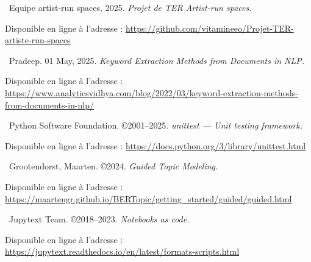 \documentclass[mstat,12pt]{unswthesis}
\begin{document}
\hypertarget{refs}{}
\begin{CSLReferences}{0}{0}

\leavevmode\hypertarget{ref-ARS}{}%
\textbullet\ Equipe artist-run spaces, 2025. \emph{Projet de TER Artist-run spaces.} 

Disponible en ligne à l'adresse : \url{https://github.com/vitamineeo/Projet-TER-artiste-run-spaces}

\vspace{0.8em}

\leavevmode\hypertarget{ref-pradeep}{}%
\textbullet\ Pradeep. 01 May, 2025. \emph{Keyword Extraction Methods from Documents in NLP.} 

Disponible en ligne à l'adresse : \url{https://www.analyticsvidhya.com/blog/2022/03/keyword-extraction-methods-from-documents-in-nlp/}

\vspace{0.8em}

\leavevmode\hypertarget{ref-python}{}%
\textbullet\ Python Software Foundation. ©2001--2025. \emph{unittest — Unit testing framework.}  

Disponible en ligne à l'adresse : \url{https://docs.python.org/3/library/unittest.html}

\vspace{0.8em}

\leavevmode\hypertarget{ref-bertopic}{}%
\textbullet\ Grootendorst, Maarten. ©2024. \emph{Guided Topic Modeling.}  

Disponible en ligne à l'adresse : \url{https://maartengr.github.io/BERTopic/getting_started/guided/guided.html}

\vspace{0.8em}

\leavevmode\hypertarget{ref-jupytext}{}%
\textbullet\ Jupytext Team. ©2018--2023. \emph{Notebooks as code.}  

Disponible en ligne à l'adresse : \url{https://jupytext.readthedocs.io/en/latest/formats-scripts.html}

\end{CSLReferences}
\end{document}
